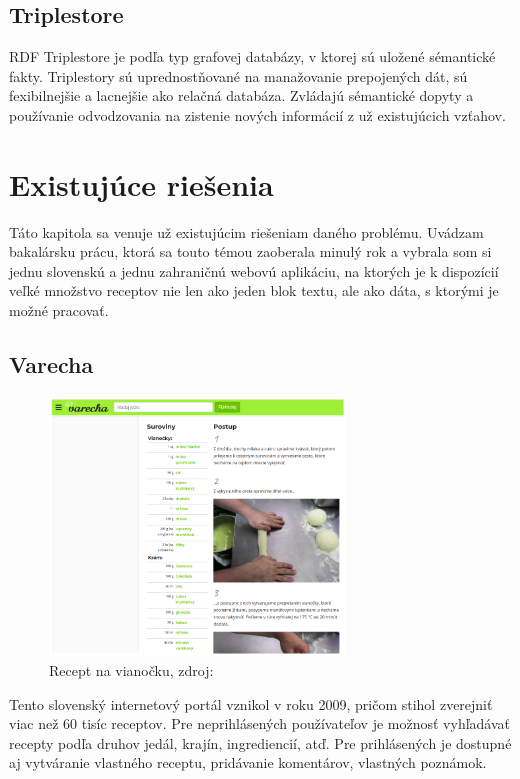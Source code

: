 \subsection{Triplestore} \label{secTriplestore}
RDF Triplestore je podľa \cite{triplestore} typ grafovej databázy, v ktorej sú uložené sémantické
fakty. Triplestory sú uprednostňované na manažovanie prepojených dát, sú fexibilnejšie
a lacnejšie ako relačná databáza. Zvládajú sémantické dopyty a používanie odvodzovania na zistenie nových informácií z už existujúcich vzťahov.


\section{Existujúce riešenia} 
Táto kapitola sa venuje už existujúcim riešeniam daného problému. Uvádzam bakalársku prácu, ktorá sa touto témou zaoberala minulý rok a vybrala som si jednu slovenskú
a jednu zahraničnú webovú aplikáciu, na ktorých je k dispozícií veľké množstvo receptov nie len ako jeden blok textu, ale ako dáta, s ktorými je možné pracovať.

\subsection{Varecha}

\begin{figure}[h]
\centering
\includegraphics[width=0.7\textwidth]{images/varecha}
\caption{Recept na vianočku, zdroj: \cite{varecha}}
\label{varecha}
\end{figure}

Tento slovenský internetový portál \cite{varecha} vznikol v roku 2009, pričom stihol zverejniť viac
než 60 tisíc receptov. Pre neprihlásených používateľov je možnosť vyhľadávať recepty
podľa druhov jedál, krajín, ingrediencií, atď. Pre prihlásených je dostupné aj vytváranie
vlastného receptu, pridávanie komentárov, vlastných poznámok.

